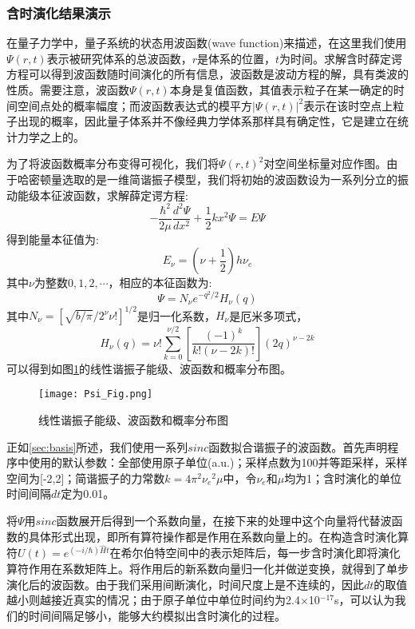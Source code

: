 
\subsubsection{含时演化结果演示}
在量子力学中，量子系统的状态用波函数(wave function)来描述，在这里我们使用$\Psi(r,t)$表示被研究体系的总波函数，$r$是体系的位置，$t$为时间。求解含时薛定谔方程可以得到波函数随时间演化的所有信息，波函数是波动方程的解，具有类波的性质。需要注意，波函数$\Psi(r,t)$本身是复值函数，其值表示粒子在某一确定的时间空间点处的概率幅度；而波函数表达式的模平方${|\Psi(r,t)|}^2$表示在该时空点上粒子出现的概率，因此量子体系并不像经典力学体系那样具有确定性，它是建立在统计力学之上的。

为了将波函数概率分布变得可视化，我们将${\Psi(r,t)}^2$对空间坐标量对应作图。由于哈密顿量选取的是一维简谐振子模型，我们将初始的波函数设为一系列分立的振动能级本征波函数，求解薛定谔方程:
\begin{equation}
  -\frac{\hbar^2}{2\mu}\frac{d^2\Psi}{dx^2} + \frac{1}{2}kx^2\Psi = E \Psi
\end{equation}
\noindent 得到能量本征值为:
\begin{equation}
  E_{\nu} = \left( \nu + \frac{1}{2}\right ) h \nu_e
\end{equation}
\noindent 其中$\nu$为整数$0,1,2,\cdots$，相应的本征函数为:
\begin{equation}
  \Psi = N_{\nu}e^{-q^2/2}H_{\nu}(q)
\end{equation}
\noindent 其中$N_{\nu} = {\left[ \sqrt{b/\pi} / 2^{\nu} \nu ! \right]}^{1/2}$是归一化系数，$H_{\nu}$是厄米多项式，
\begin{equation}
  H_{\nu}(q) = \nu ! \sum_{k=0}^{\nu / 2} \left[ \frac{{(-1)}^k}{k! {(\nu - 2k)!}} \right] {(2q)}^{\nu-2k}
\end{equation}
可以得到如图\ref{fig:Psi_Fig}的线性谐振子能级、波函数和概率分布图。
\begin{figure}[h]
  \center
  \vspace{-1mm}
  \texttt{[image: Psi\_Fig.png]}
  \caption{线性谐振子能级、波函数和概率分布图}
  \label{fig:Psi_Fig}
\end{figure}

正如\ref{sec:basis}所述，我们使用一系列$sinc$函数拟合谐振子的波函数。首先声明程序中使用的默认参数：全部使用原子单位(a.u.)；采样点数为100并等距采样，采样空间为[-2,2]；简谐振子的力常数$k=4{\pi}^2{\nu_e}^2\mu$中，令$\nu_e$和$\mu$均为1；含时演化的单位时间间隔$dt$定为0.01。

将$\Psi$用$sinc$函数展开后得到一个系数向量，在接下来的处理中这个向量将代替波函数的具体形式出现，即所有算符操作都是作用在系数向量上的。在构造含时演化算符$U(t) = e^{(-i/\hbar)\hat{H}t}$在希尔伯特空间中的表示矩阵后，每一步含时演化即将演化算符作用在系数矩阵上。将作用后的新系数向量归一化并做逆变换，就得到了单步演化后的波函数。由于我们采用间断演化，时间尺度上是不连续的，因此$dt$的取值越小则越接近真实的情况；由于原子单位中单位时间约为2.4$\times$10$^{-17}$s，可以认为我们的时间间隔足够小，能够大约模拟出含时演化的过程。

